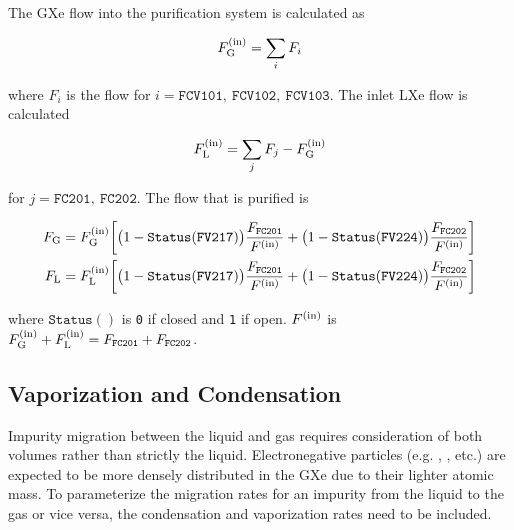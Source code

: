 The GXe flow into the purification system is calculated as

\vspace{-10pt}

\begin{equation}
F_{\mathrm{G}}^{(\mathrm{in})} = \sum_i F_i
\end{equation}

\noindent where $F_i$ is the flow for $i = \mathtt{FCV101,\ FCV102,\ FCV103}$.  The inlet LXe flow is calculated

\vspace{-10pt}

\begin{equation}
F_{\mathrm{L}}^{(\mathrm{in})} = \sum_j F_j - F_{\mathrm{G}}^{(\mathrm{in})}
\end{equation}

\noindent for $j = \mathtt{FC201,\ FC202}$.  The flow that is purified is

\vspace{-20pt}

\begin{subequations}
\begin{align}
F_{\mathrm{G}} &= F_{\mathrm{G}}^{(\mathrm{in})} \bigg[ \big(1 - \mathtt{Status(FV217)}\big) \frac{F_{\mathtt{FC201}}}{F^{(\mathrm{in})}} +
\big(1 - \mathtt{Status(FV224)}\big) \frac{F_{\mathtt{FC202}}}{F^{(\mathrm{in})}} \bigg]
\\
F_{\mathrm{L}} &= F_{\mathrm{L}}^{(\mathrm{in})} \bigg[ \big(1 - \mathtt{Status(FV217)}\big) \frac{F_{\mathtt{FC201}}}{F^{(\mathrm{in})}} +
\big(1 - \mathtt{Status(FV224)}\big) \frac{F_{\mathtt{FC202}}}{F^{(\mathrm{in})}} \bigg]
\end{align}
\end{subequations}

\noindent where $\mathtt{Status()}$ is \texttt{0} if closed and \texttt{1} if open.  $F^{(\mathrm{in})}$ is
$F_{\mathrm{G}}^{(\mathrm{in})} + F_{\mathrm{L}}^{(\mathrm{in})} = F_{\mathtt{FC201}} + F_{\mathtt{FC202}}$.



\subsection{Vaporization and Condensation}
\label{subsec:electron_lifetime_model_vap_and_cond}
Impurity migration between the liquid and gas requires consideration of both volumes rather than strictly the liquid.  Electronegative
particles (e.g. , , etc.) are expected to be more densely distributed in the GXe due to their lighter atomic mass.  To
parameterize the migration rates for an impurity from the liquid to the gas or vice versa, the condensation and
vaporization rates need to be included.


